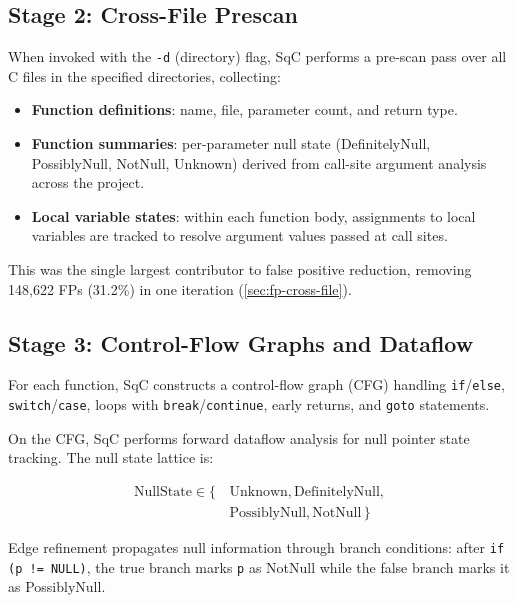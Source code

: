 \subsection{Stage 2: Cross-File Prescan}
\label{sec:prescan}

When invoked with the \texttt{-d} (directory) flag, SqC performs a
pre-scan pass over all C files in the specified directories, collecting:

\begin{itemize}
    \item \textbf{Function definitions}: name, file, parameter count,
        and return type.
    \item \textbf{Function summaries}: per-parameter null state
        (DefinitelyNull, PossiblyNull, NotNull, Unknown) derived from
        call-site argument analysis across the project.
    \item \textbf{Local variable states}: within each function body,
        assignments to local variables are tracked to resolve argument
        values passed at call sites.
\end{itemize}

This was the single largest contributor to false positive reduction,
removing 148,622 FPs (31.2\%) in one iteration (\cref{sec:fp-cross-file}).

\subsection{Stage 3: Control-Flow Graphs and Dataflow}

For each function, SqC constructs a control-flow graph (CFG) handling
\texttt{if}/\texttt{else}, \texttt{switch}/\texttt{case}, loops with
\texttt{break}/\texttt{continue}, early returns, and \texttt{goto}
statements.

On the CFG, SqC performs forward dataflow analysis for null pointer
state tracking.  The null state lattice is:

\begin{equation}
\begin{split}
\text{NullState} \in \{\,& \text{Unknown}, \text{DefinitelyNull}, \\
                          & \text{PossiblyNull}, \text{NotNull}\,\}
\end{split}
\end{equation}

Edge refinement propagates null information through branch conditions:
after \texttt{if (p != NULL)}, the true branch marks \texttt{p} as
NotNull while the false branch marks it as PossiblyNull.


